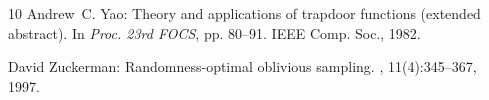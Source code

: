\documentclass[11pt]{article}
\begin{document}
\begin{thebibliography}{10}
{\sc Andrew~C. Yao}: Theory and applications of trapdoor functions (extended
  abstract).
\newblock In {\em Proc. 23rd FOCS}, pp. 80--91. IEEE Comp. Soc., 1982.

{\sc David Zuckerman}: Randomness-optimal oblivious sampling.
, 11(4):345--367, 1997.

\end{thebibliography}
\end{document}
